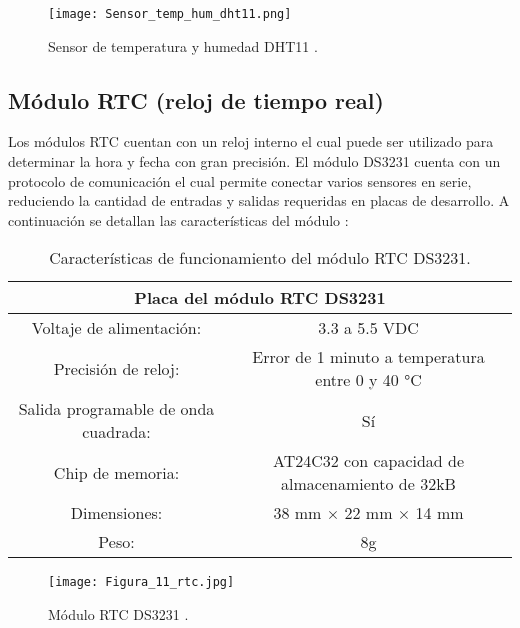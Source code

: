 \begin{figure}[H]
	\centering
	\texttt{[image: Sensor\_temp\_hum\_dht11.png]}
	\caption{Sensor de temperatura y humedad DHT11 \cite{tettsa_dht11}.}
	\label{fig:mesh11}
\end{figure}
\newpage
\subsection*{Módulo RTC (reloj de tiempo real)}
Los módulos RTC cuentan con un reloj interno el cual puede ser utilizado para determinar la hora y fecha con gran precisión. El módulo DS3231 cuenta con un protocolo de comunicación el cual permite conectar varios sensores en serie, reduciendo la cantidad de entradas y salidas requeridas en placas de desarrollo. A continuación se detallan las características del módulo \cite{la_electronica_DS3231}:

\begin{table}[H]
	\centering
	\begin{tabular}{|c|c|}
		\hline
		\multicolumn{2}{|c|}{\textbf{Placa del módulo RTC DS3231}}\\ \hline
		Voltaje de alimentación: & 3.3 a 5.5 VDC \\ \hline
		Precisión de reloj: & Error de 1 minuto a temperatura entre 0 y 40 °C \\ \hline
		Salida programable de onda cuadrada: & Sí \\ \hline
		Chip de memoria: & AT24C32 con capacidad de almacenamiento de 32kB \\ \hline
		Dimensiones: & 38 mm $\times$ 22 mm $\times$ 14 mm \\ \hline
		Peso: & 8g \\ \hline
	\end{tabular}
	\caption{Características de funcionamiento del módulo RTC DS3231.}
	\label{Cuadro:caracter_rtc}
\end{table}

\begin{figure}[H]
	\centering
	\texttt{[image: Figura\_11\_rtc.jpg]}
	\caption{Módulo RTC DS3231 \cite{la_electronica_DS3231}.}
	\label{fig:modulo_rtc}
\end{figure}

